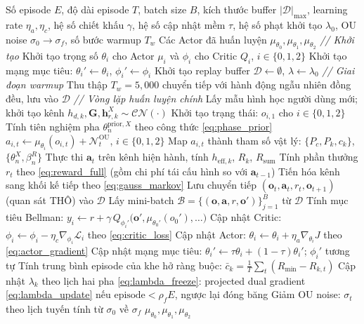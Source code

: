 \begin{algorithm}[H]
\caption{Proposed MADDPG-Based STAR-RIS RSMA Optimization}
\label{alg:maddpg_train}
\begin{algorithmic}[1]
\Require Số episode $E$, độ dài episode $T$, batch size $B$, kích thước
buffer $|\mathcal{D}|_{\max}$, learning rate $\eta_a, \eta_c$, hệ số
chiết khấu $\gamma$, hệ số cập nhật mềm $\tau$, hệ số phạt khởi tạo
$\lambda_0$, OU noise $\sigma_0 \to \sigma_f$, số bước warmup $T_w$
\Ensure Các Actor đã huấn luyện $\mu_{\theta_0}, \mu_{\theta_1}, \mu_{\theta_2}$
\Statex \textit{// Khởi tạo}
\State Khởi tạo trọng số $\theta_i$ cho Actor $\mu_i$ và $\phi_i$ cho Critic $Q_i$, $i \in \{0, 1, 2\}$
\State Khởi tạo mạng mục tiêu: $\theta_i' \leftarrow \theta_i$, $\phi_i' \leftarrow \phi_i$
\State Khởi tạo replay buffer $\mathcal{D} \leftarrow \emptyset$, $\lambda \leftarrow \lambda_0$
\Statex \textit{// Giai đoạn warmup}
\State Thu thập $T_w = 5{,}000$ chuyển tiếp với hành động ngẫu nhiên đồng đều, lưu vào $\mathcal{D}$
\Statex \textit{// Vòng lặp huấn luyện chính}
  \State Lấy mẫu hình học người dùng mới; khởi tạo kênh $h_{d,k}, \mathbf{G}, \mathbf{h}_{r,k}^X \sim \mathcal{CN}(\cdot)$
  \State Khởi tạo trạng thái: $o_{i,1}$ cho $i \in \{0, 1, 2\}$
    \State Tính tiên nghiệm pha $\theta_n^{\text{prior},X}$ theo công thức \eqref{eq:phase_prior}
    \State $a_{i,t} \leftarrow \mu_{\theta_i}(o_{i,t}) + \mathcal{N}_t^{\text{OU}}$, $i \in \{0, 1, 2\}$
    \State Map $a_{i,t}$ thành tham số vật lý: $\{P_c, P_k, c_k\}$, $\{\theta_n^X, \beta_n^R\}$
    \State Thực thi $\mathbf{a}_t$ trên kênh hiện hành, tính $h_{\text{eff},k}$, $R_k$, $R_{\text{sum}}$
    \State Tính phần thưởng $r_t$ theo \eqref{eq:reward_full} (gồm chi phí tái cấu hình so với $\mathbf{a}_{t-1}$)
    \State Tiến hóa kênh sang khối kế tiếp theo \eqref{eq:gauss_markov}
    \State Lưu chuyển tiếp $(\mathbf{o}_t, \mathbf{a}_t, r_t, \mathbf{o}_{t+1})$ (quan sát THÔ) vào $\mathcal{D}$
      \State Lấy mini-batch $\mathcal{B} = \{(\mathbf{o}, \mathbf{a}, r, \mathbf{o}')\}_{j=1}^B$ từ $\mathcal{D}$
        \State Tính mục tiêu Bellman: $y_i \leftarrow r + \gamma\, Q_{\phi_i'}\!\big(\mathbf{o}', \mu_{\theta_0'}(o_0'), \ldots\big)$
        \State Cập nhật Critic: $\phi_i \leftarrow \phi_i - \eta_c \nabla_{\phi_i} \mathcal{L}_i$ theo \eqref{eq:critic_loss}
        \State Cập nhật Actor: $\theta_i \leftarrow \theta_i + \eta_a \nabla_{\theta_i} J$ theo \eqref{eq:actor_gradient}
        \State Cập nhật mạng mục tiêu: $\theta_i' \leftarrow \tau \theta_i + (1-\tau)\theta_i'$; $\phi_i'$ tương tự
      \EndFor
    \EndIf
  \EndFor
  \State Tính trung bình episode của khe hở ràng buộc: $\bar{c}_k = \frac{1}{T}\sum_t (R_{\min} - R_{k,t})$
  \State Cập nhật $\lambda_k$ theo lịch hai pha \eqref{eq:lambda_freeze}: projected dual gradient \eqref{eq:lambda_update} nếu $\text{episode} < \rho_f E$, ngược lại đóng băng
  \State Giảm OU noise: $\sigma_t$ theo lịch tuyến tính từ $\sigma_0$ về $\sigma_f$
\EndFor
\State \Return $\mu_{\theta_0}, \mu_{\theta_1}, \mu_{\theta_2}$
\end{algorithmic}
\end{algorithm}


